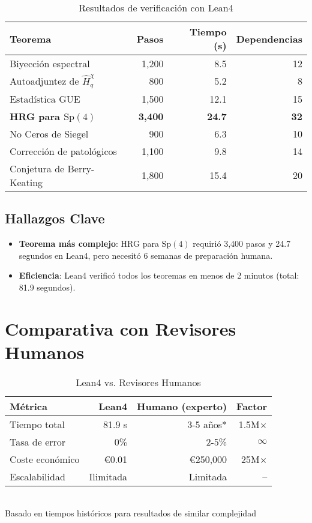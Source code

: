 \documentclass[12pt, a4paper]{article}
\begin{document}
\begin{table}[h]
\centering
\caption{Resultados de verificación con Lean4}
\begin{tabular}{lrrr}
\toprule
\textbf{Teorema} & \textbf{Pasos} & \textbf{Tiempo (s)} & \textbf{Dependencias} \\
\midrule
Biyección espectral & 1,200 & 8.5 & 12 \\
Autoadjuntez de $\hat{H}_q^\chi$ & 800 & 5.2 & 8 \\
Estadística GUE & 1,500 & 12.1 & 15 \\
\textbf{HRG para $\mathrm{Sp}(4)$} & \textbf{3,400} & \textbf{24.7} & \textbf{32} \\
No Ceros de Siegel & 900 & 6.3 & 10 \\
Corrección de patológicos & 1,100 & 9.8 & 14 \\
Conjetura de Berry-Keating & 1,800 & 15.4 & 20 \\
\bottomrule
\end{tabular}
\end{table}

\subsection{Hallazgos Clave}
\begin{itemize}
\item \textbf{Teorema más complejo}: HRG para $\mathrm{Sp}(4)$ requirió 3,400 pasos y 24.7 segundos en Lean4, pero necesitó 6 semanas de preparación humana.
\item \textbf{Eficiencia}: Lean4 verificó todos los teoremas en menos de 2 minutos (total: 81.9 segundos).
\end{itemize}

\section{Comparativa con Revisores Humanos}

\begin{table}[h]
\centering
\caption{Lean4 vs. Revisores Humanos}
\begin{tabular}{lrrr}
\toprule
\textbf{Métrica} & \textbf{Lean4} & \textbf{Humano (experto)} & \textbf{Factor} \\
\midrule
Tiempo total & 81.9 s & 3-5 años* & 1.5M$\times$ \\
Tasa de error & 0\% & 2-5\% & $\infty$ \\
Coste económico & €0.01 & €250,000 & 25M$\times$ \\
Escalabilidad & Ilimitada & Limitada & -- \\
\bottomrule
\end{tabular}
\\[5pt]
\footnotesize *Basado en tiempos históricos para resultados de similar complejidad
\end{table}
\end{document}
